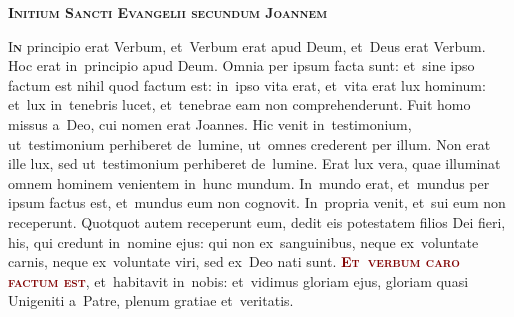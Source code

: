 \documentclass[third]{../altarcard}
\begin{document}
\begin{center}

    \begin{minipage}{0.7\linewidth}

        \vspace*{3cm}

        \begin{center}
            \scshape\bfseries\Huge
            Initium Sancti Evangelii secundum Joannem
        \end{center}


        \huge

        \lettrine[lines=3]{\color{Maroon}I}{\bfseries\color{Maroon}n} principio
        erat Verbum, et~Verbum erat apud Deum, et~Deus erat Verbum. Hoc erat
        in~principio apud Deum. Omnia per ipsum facta sunt: et~sine ipso factum
        est nihil quod factum est: in~ipso vita erat, et~vita erat lux hominum:
        et~lux in~tenebris lucet, et~tenebrae eam non comprehenderunt. Fuit homo
        missus a~Deo, cui nomen erat Joannes. Hic venit in~testimonium,
        ut~testimonium perhiberet de~lumine, ut~omnes crederent per illum. Non
        erat ille lux, sed ut~testimonium perhiberet de~lumine. Erat lux vera,
        quae illuminat omnem hominem venientem in~hunc mundum. In~mundo erat,
        et~mundus per ipsum factus est, et~mundus eum non cognovit. In~propria
        venit, et~sui eum non receperunt. Quotquot autem receperunt eum, dedit
        eis potestatem filios Dei fieri, his, qui credunt in~nomine ejus: qui
        non ex~sanguinibus, neque ex~voluntate carnis, neque ex~voluntate viri,
        sed ex~Deo nati sunt.
        \textcolor{Maroon}{\textbf{\textsc{Et~verbum caro factum est}}},
        et~habitavit in~nobis: et~vidimus gloriam ejus, gloriam quasi Unigeniti
        a~Patre, plenum gratiae et~veritatis.
    \end{minipage}
\end{center}

\vspace*{1cm}
\end{document}

